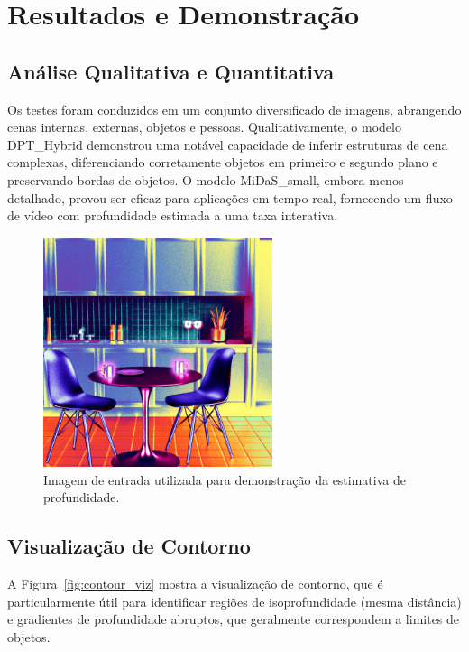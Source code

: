 \documentclass{SBCbookchapter}
\begin{document}
    \section{Resultados e Demonstração}
    \subsection{Análise Qualitativa e Quantitativa}
    Os testes foram conduzidos em um conjunto diversificado de imagens, abrangendo cenas internas, externas, objetos e pessoas. Qualitativamente, o modelo DPT\_Hybrid demonstrou uma notável capacidade de inferir estruturas de cena complexas, diferenciando corretamente objetos em primeiro e segundo plano e preservando bordas de objetos. O modelo MiDaS\_small, embora menos detalhado, provou ser eficaz para aplicações em tempo real, fornecendo um fluxo de vídeo com profundidade estimada a uma taxa interativa.

    \begin{figure}[h!]
        \centering
        \includegraphics[width=0.6\textwidth]{../../src/assets/images/table.png}
        \caption{Imagem de entrada utilizada para demonstração da estimativa de
        profundidade.}
        \label{fig:bear_input}
    \end{figure}

    \subsection{Visualização de Contorno}
    A Figura~\ref{fig:contour_viz} mostra a visualização de contorno, que é particularmente útil para identificar regiões de isoprofundidade (mesma distância) e gradientes de profundidade abruptos, que geralmente correspondem a limites de objetos.
\end{document}
